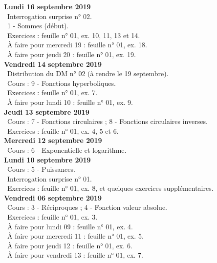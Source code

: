 \documentclass[12pt,a4paper]{article}
\begin{document}
 \noindent\textbf{\bf Lundi 16 septembre 2019}\\ 
 \bu\ Interrogation surprise n° 02.\\
 \bu\ 1 - Sommes (début).\\
 \bu\ Exercices : feuille n° 01, ex. 10, 11, 13 et 14.\\
 \bu\ À faire pour mercredi 19 : feuille n° 01, ex. 18.\\
 \bu\ À faire pour jeudi 20 : feuille n° 01, ex. 19.\vspace{.4cm}\\
 
 \noindent\textbf{Vendredi 14 septembre 2019}\\
 \bu\ Distribution du DM n° 02 (à rendre le 19 septembre).\\
 \bu\ Cours : 9 - Fonctions hyperboliques.\\
 \bu\ Exercices : feuille n° 01, ex. 7.\\
 \bu\ À faire pour lundi 10 : feuille n° 01, ex. 9.\vspace{.4cm}\\
 
 \noindent\textbf{\bf Jeudi 13 septembre 2019}\\
 \bu\ Cours : 7 - Fonctions circulaires ; 8 - Fonctions circulaires inverses.\\
 \bu\ Exercices : feuille n° 01, ex. 4, 5 et 6.\vspace{.4cm}\\
     
 \noindent\textbf{\bf Mercredi 12 septembre 2019}\\
 \bu\ Cours : 6 - Exponentielle et logarithme.\vspace{.4cm}\\
 
 \noindent\textbf{\bf Lundi 10 septembre 2019}\\
 \bu\ Cours : 5 - Puissances.\\
 \bu\ Interrogation surprise n° 01.\\
 \bu\ Exercices : feuille n° 01, ex. 8, et quelques exercices supplémentaires.\vspace{.4cm}\\
 
\noindent\textbf{Vendredi 06 septembre 2019}\\
\bu\ Cours : 3 - Réciproques ; 4 - Fonction valeur absolue.\\
\bu\ Exercices : feuille n° 01, ex. 3.\\
\bu\ À faire pour lundi 09 : feuille n° 01, ex. 4.\\
\bu\ À faire pour mercredi 11 : feuille n° 01, ex. 5.\\
\bu\ À faire pour jeudi 12 : feuille n° 01, ex. 6.\\
\bu\ À faire pour vendredi 13 : feuille n° 01, ex. 7.\vspace{.4cm}\\
 
\end{document}
